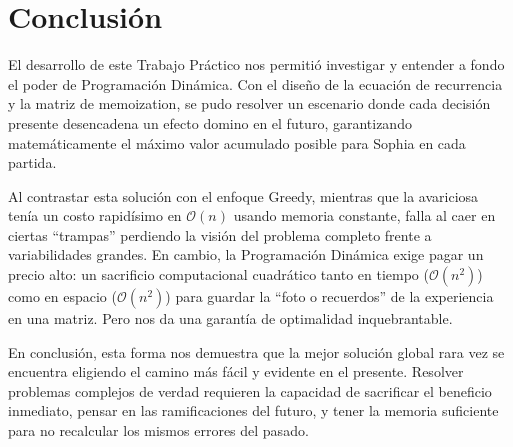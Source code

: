 \section{Conclusión}

El desarrollo de este Trabajo Práctico nos permitió investigar y entender a fondo el poder de Programación Dinámica. Con el diseño de la ecuación de recurrencia y la matriz de memoization, se pudo resolver un escenario donde cada decisión presente desencadena un efecto domino en el futuro, garantizando matemáticamente el máximo valor acumulado posible para Sophia en cada partida.

Al contrastar esta solución con el enfoque Greedy, mientras que la avariciosa tenía un costo rapidísimo en $\mathcal{O}(n)$ usando memoria constante, falla al caer en ciertas ``trampas'' perdiendo la visión del problema completo frente a variabilidades grandes. En cambio, la Programación Dinámica exige pagar un precio alto: un sacrificio computacional cuadrático tanto en tiempo ($\mathcal{O}(n^2)$) como en espacio ($\mathcal{O}(n^2)$) para guardar la ``foto o recuerdos'' de la experiencia en una matriz. Pero nos da una garantía de optimalidad inquebrantable.

En conclusión, esta forma nos demuestra que la mejor solución global rara vez se encuentra eligiendo el camino más fácil y evidente en el presente. Resolver problemas complejos de verdad requieren la capacidad de sacrificar el beneficio inmediato, pensar en las ramificaciones del futuro, y tener la memoria suficiente para no recalcular los mismos errores del pasado.


